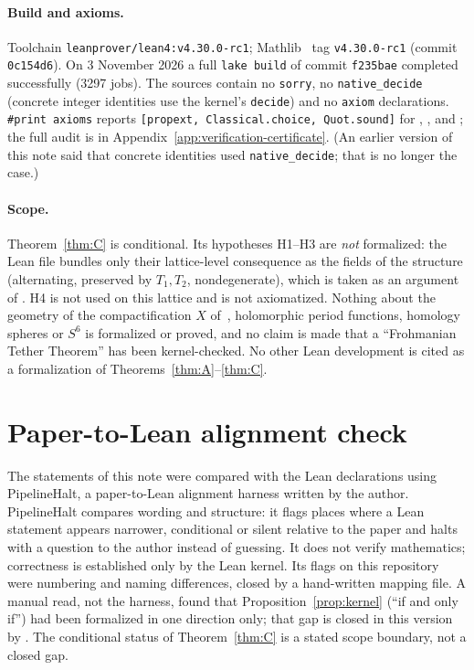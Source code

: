 \documentclass[11pt,a4paper]{article}
\theoremstyle{definition}
\theoremstyle{remark}
\begin{document}
\paragraph{Build and axioms.} Toolchain \texttt{leanprover/lean4:v4.30.0-rc1}; Mathlib~\cite{Mathlib} tag \texttt{v4.30.0-rc1} (commit \texttt{0c154d6}). On 3 November 2026 a full \texttt{lake build} of commit \texttt{f235bae} completed successfully (3297 jobs). The sources contain no \texttt{sorry}, no \texttt{native\_decide} (concrete integer identities use the kernel's \texttt{decide}) and no \texttt{axiom} declarations. \texttt{\#print axioms} reports \texttt{[propext, Classical.choice, Quot.sound]} for , ,  and ; the full audit is in Appendix~\ref{app:verification-certificate}. (An earlier version of this note said that concrete identities used \texttt{native\_decide}; that is no longer the case.)

\paragraph{Scope.} Theorem~\ref{thm:C} is conditional. Its hypotheses H1--H3 are \emph{not} formalized: the Lean file bundles only their lattice-level consequence as the fields of the structure  (alternating, preserved by $T_1,T_2$, nondegenerate), which is taken as an argument of . H4 is not used on this lattice and is not axiomatized. Nothing about the geometry of the compactification $X$ of~\cite{AlpogeS6}, holomorphic period functions, homology spheres or $S^6$ is formalized or proved, and no claim is made that a ``Frohmanian Tether Theorem'' has been kernel-checked. No other Lean development is cited as a formalization of Theorems~\ref{thm:A}--\ref{thm:C}.

\section{Paper-to-Lean alignment check}\label{sec:align}
The statements of this note were compared with the Lean declarations using PipelineHalt, a paper-to-Lean alignment harness written by the author. PipelineHalt compares wording and structure: it flags places where a Lean statement appears narrower, conditional or silent relative to the paper and halts with a question to the author instead of guessing. It does not verify mathematics; correctness is established only by the Lean kernel. Its flags on this repository were numbering and naming differences, closed by a hand-written mapping file. A manual read, not the harness, found that Proposition~\ref{prop:kernel} (``if and only if'') had been formalized in one direction only; that gap is closed in this version by . The conditional status of Theorem~\ref{thm:C} is a stated scope boundary, not a closed gap.
\end{document}
